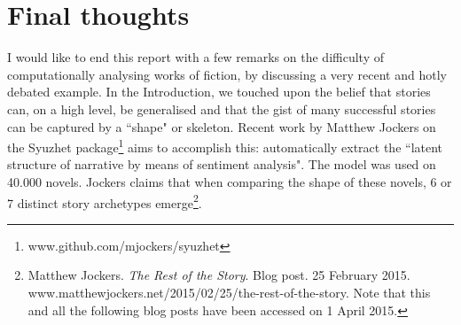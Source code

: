 \documentclass[bsc,frontabs,singlespacing,parskip, twoside]{infthesis}
\begin{document}
\section{Final thoughts}
I would like to end this report with a few remarks on the difficulty of computationally analysing works of fiction, by discussing a very recent and hotly debated example. In the Introduction, we touched upon the belief that stories can, on a high level, be generalised and that the gist of many successful stories can be captured by a ``shape" or skeleton. Recent work by Matthew Jockers on the Syuzhet package\footnote{www.github.com/mjockers/syuzhet} aims to accomplish this: automatically extract the ``latent structure of narrative by means of sentiment analysis". The model was used on 40.000 novels. Jockers claims that when comparing the shape of these novels, 6 or 7 distinct story archetypes emerge\footnote{Matthew Jockers. \textit{The Rest of the Story}. Blog post. 25 February 2015. www.matthewjockers.net/2015/02/25/the-rest-of-the-story. Note that this and all the following blog posts have been accessed on 1 April 2015.}. 
\end{document}

